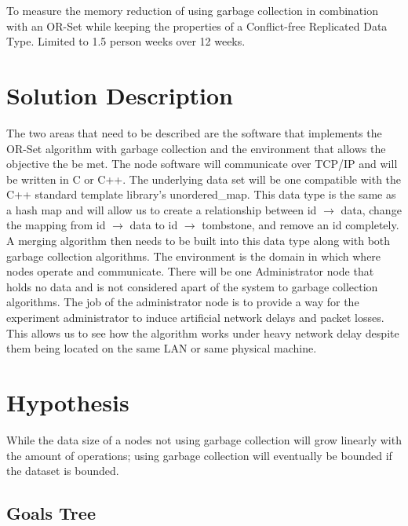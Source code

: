 \documentclass{article}
\begin{document}
\begin{multicols}{2}
\begin{refsection}
To measure the memory reduction of using garbage collection in combination with an OR-Set while keeping the properties of a Conflict-free Replicated Data Type. Limited to 1.5 person weeks over 12 weeks.

\section*{Solution Description}

The two areas that need to be described are the software that implements the OR-Set algorithm with garbage collection and the environment that allows the objective the be met. The node software will communicate over TCP/IP and will be written in C or C++. The underlying data set will be one compatible with the C++ standard template library's unordered\_map. This data type is the same as a hash map and will allow us to create a relationship between id $\rightarrow$ data, change the mapping from id $\rightarrow$ data to id $\rightarrow$ tombstone, and remove an id completely. A merging algorithm then needs to be built into this data type along with both garbage collection algorithms. The environment is the domain in which where nodes operate and communicate. There will be one Administrator node that holds no data and is not considered apart of the system to garbage collection algorithms. The job of the administrator node is to provide a way for the experiment administrator to induce artificial network delays and packet losses. This allows us to see how the algorithm works under heavy network delay despite them being located on the same LAN or same physical machine.


\section*{Hypothesis}

While the data size of a nodes not using garbage collection will grow linearly with the amount of operations; using garbage collection will eventually be bounded if the dataset is bounded.

\subsection*{Goals Tree}





\end{refsection}
\end{multicols}
\end{document}
